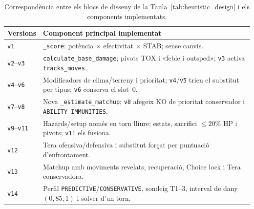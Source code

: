 \begin{table}[htbp]
    \centering
    \caption{Correspondència entre els blocs de disseny de la Taula~\ref{tab:heuristic_design} i els components implementats.}
    \label{tab:heuristic_implementation}
    \small
    \renewcommand{\arraystretch}{1.25}
    \begin{tabularx}{\textwidth}{lX}
        \toprule
        \textbf{Versions}         & \textbf{Component principal implementat}                                                                                          \\
        \midrule
        \texttt{v1}               & \texttt{\_score}: potència $\times$ efectivitat $\times$ STAB; sense canvis.                                                      \\
        \arrayrulecolor{gray!30}\hline\arrayrulecolor{black}
        \texttt{v2}--\texttt{v3}  & \texttt{calculate\_base\_damage}; pivots TOX i «feble i outsped»; \texttt{v3} activa \texttt{tracks\_moves}.                       \\
        \arrayrulecolor{gray!30}\hline\arrayrulecolor{black}
        \texttt{v4}--\texttt{v6}  & Modificadors de clima/terreny i prioritat; \texttt{v4}/\texttt{v5} trien el substitut per tipus; \texttt{v6} conserva el slot~0. \\
        \arrayrulecolor{gray!30}\hline\arrayrulecolor{black}
        \texttt{v7}--\texttt{v8}  & Nova \texttt{\_estimate\_matchup}; \texttt{v8} afegeix KO de prioritat conservador i \texttt{ABILITY\_IMMUNITIES}.               \\
        \arrayrulecolor{gray!30}\hline\arrayrulecolor{black}
        \texttt{v9}--\texttt{v11} & Hazards/setup només en torn lliure; estats, sacrifici $\le 20\%$ HP i pivots; \texttt{v11} els fusiona.                           \\
        \arrayrulecolor{gray!30}\hline\arrayrulecolor{black}
        \texttt{v12}              & Tera ofensiva/defensiva i substitut forçat per puntuació d'enfrontament.                                                          \\
        \arrayrulecolor{gray!30}\hline\arrayrulecolor{black}
        \texttt{v13}              & Matchup amb moviments revelats, recuperació, Choice lock i Tera conservadora.                                                     \\
        \arrayrulecolor{gray!30}\hline\arrayrulecolor{black}
        \texttt{v14}              & Perfil \texttt{PREDICTIVE}/\texttt{CONSERVATIVE}, sondeig T1--3, interval de dany $(0{,}85,1)$ i solver d'un torn.                \\
        \bottomrule
    \end{tabularx}
\end{table}

